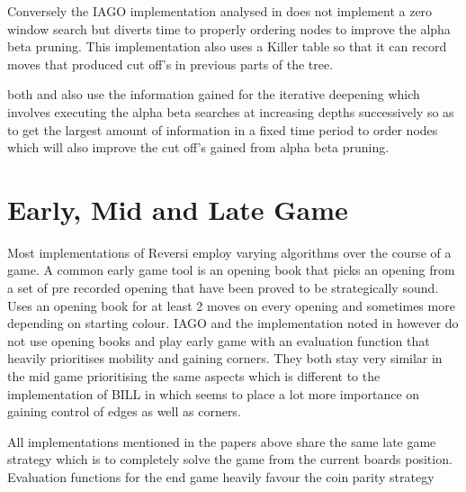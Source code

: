 \documentclass[review]{cmpreport}
\begin{document}
Conversely the IAGO implementation analysed in \citet{rosenbloom1982world} does not implement a zero window search but diverts time to properly ordering nodes to improve the alpha beta pruning. This implementation also uses a Killer table so that it can record moves that produced cut off's in previous parts of the tree. 

both \citet{olivito2010fpga} and \citet{rosenbloom1982world} also use the information gained for the iterative deepening which involves executing the alpha beta searches at increasing depths successively so as to get the largest amount of information in a fixed time period to order nodes which will also improve the cut off's gained from alpha beta pruning. 

\section{Early, Mid and Late Game}
Most implementations of Reversi employ varying algorithms over the course of a game. A common early game tool is an opening book that picks an opening from a set of pre recorded opening that have been proved to be strategically sound. \citet{lee1986bill} Uses an opening book for at least 2 moves on every opening and sometimes more depending on starting colour. IAGO and the implementation noted in \citet{olivito2010fpga} however do not use opening books and play early game with an evaluation function that heavily prioritises mobility and gaining corners. They both stay very similar in the mid game prioritising the same aspects which is different to the implementation of BILL in \citet{lee1986bill} which seems to place a lot more importance on gaining control of edges as well as corners.   

All implementations mentioned in the papers above share the same late game strategy which is to completely solve the game from the current boards position. Evaluation functions for the end game heavily favour the coin parity strategy \citep[sec.  3.4.1.3]{lee1986bill} 	





	
\end{document}
